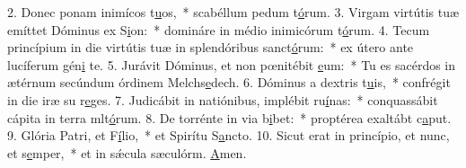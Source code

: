 2. Donec ponam inimícos t\uline{u}os,~* scabéllum pedum t\uline{ó}rum.
3. Virgam virtútis tuæ emíttet Dóminus ex S\uline{i}on:~* domináre in médio inimicórum t\uline{ó}rum.
4. Tecum princípium in die virtútis tuæ in splendóribus sanct\uline{ó}rum:~* ex útero ante lucíferum gén\uline{i} te.
5. Jurávit Dóminus, et non pœnitébit \uline{e}um:~* Tu es sacérdos in ætérnum secúndum órdinem Melchs\uline{e}dech.
6. Dóminus a dextris t\uline{u}is,~* confrégit in die iræ su r\uline{e}ges.
7. Judicábit in natiónibus, implébit ru\uline{í}nas:~* conquassábit cápita in terra mlt\uline{ó}rum.
8. De torrénte in via b\uline{i}bet:~* proptérea exaltábt c\uline{a}put.
9. Glória Patri, et F\uline{í}lio,~* et Spirítu S\uline{a}ncto.
10. Sicut erat in princípio, et nunc, et s\uline{e}mper,~* et in sǽcula sæculórm. \uline{A}men.

